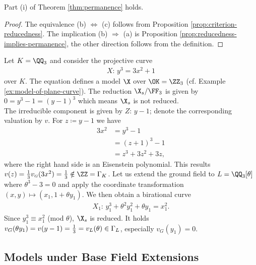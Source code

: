 \begin{corollary} \label{cor:permanence-part-i}
    Part (i) of Theorem \ref{thm:permanence} holds.
\end{corollary}

\begin{proof}
    The equivalence (b) $\iff$ (c) follows from Proposition \ref{prop:criterion-reducedness}.
    The implication (b) $\Rightarrow$ (a) is Proposition \ref{prop:reducedness-implies-permanence}, the other direction follows from the definition.
\end{proof}


\begin{example}
    Let $K = \QQ_3$ and consider the projective curve
    \begin{align}
        X: \, y^3 = 3x^2 + 1
    \end{align}
    over $K$.
    The equation defines a model $\X$ over $\OK=\ZZ_3$ (cf. Example \ref{ex:model-of-plane-curve}).
    The reduction $\X_s/\FF_3$ is given by $0 = y^3 - 1 = (y - 1)^3$ which means $\X_s$ is not reduced. \\
    The irreducible component is given by $Z: \, y-1$; denote the corresponding valuation by $v$.
    For $z \coloneqq y - 1$ we have
    \begin{align*}
        3x^2 &= y^3 - 1 \\
            &= (z+1)^3 - 1 \\
            &= z^3 + 3z^2 + 3z,
    \end{align*}
    where the right hand side is an Eisenstein polynomial.
    This results $v(z) = \frac{1}{3}v_{\scriptscriptstyle G}(3x^2) = \frac{1}{3} \notin \ZZ = \Gamma_K$.
    Let us extend the ground field to $L = \QQ_3[\theta]$ where $\theta^3 - 3 = 0$ and apply the coordinate transformation
    $(x,y) \mapsto (x_1, 1+ \theta y_1)$.
    We then obtain a birational curve
    \begin{align}
        X_1: \, y_1^3 + \theta^2 y_1^2 + \theta y_1 = x_1^2.
    \end{align}
    Since $y_1^3 \equiv x_1^2$ (mod $\theta$), $\X_s$ is reduced.
    It holds $v_G(\theta y_1) = v_{\scriptscriptstyle}(y - 1) = \frac{1}{3} = v_L(\theta) \in \Gamma_L$, especially $v_{\scriptscriptstyle G}(y_1) = 0$.
\end{example}


\subsection{Models under Base Field Extensions}\label{subsec:models-under-base-field-extensions}


